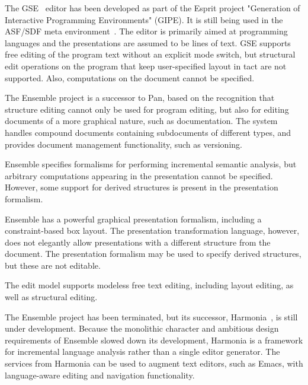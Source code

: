 
The GSE~\cite{koorn92gse} editor has been developed as part of the Esprit project "Generation of Interactive Programming Environments" (GIPE). It is still being used in the ASF/SDF meta environment~\cite{klint93asfsdf}. The editor is primarily aimed at programming languages and the presentations are assumed to be lines of text. GSE supports free editing of the program text without an explicit mode switch, but structural edit operations on the program that keep user-specified layout in tact are not supported. Also, computations on the document cannot be specified.


The Ensemble project is a successor to Pan, based on the recognition that structure editing cannot only be used for program editing, but also for editing documents of a more graphical nature, such as documentation. The system handles compound documents containing subdocuments of different types, and provides document management functionality, such as versioning.

Ensemble specifies formalisms for performing incremental semantic analysis, but arbitrary computations appearing in the presentation cannot be specified. However, some support for derived structures is present in the presentation formalism.

Ensemble has a powerful graphical presentation formalism, including a constraint-based box layout. The presentation transformation language, however, does not elegantly allow presentations with a different structure from the document. The presentation formalism may be used to specify derived structures, but these are not editable.

The edit model supports modeless free text editing, including layout editing, as well as structural editing.

The Ensemble project has been terminated, but its successor, Harmonia~\cite{boshernitsan01harmonia}, is still under development. Because the monolithic character and ambitious design requirements of Ensemble slowed down its development, Harmonia is a framework for incremental language analysis rather than a single editor generator. The services from Harmonia can be used to augment text editors, such as Emacs, with language-aware editing and navigation functionality.


